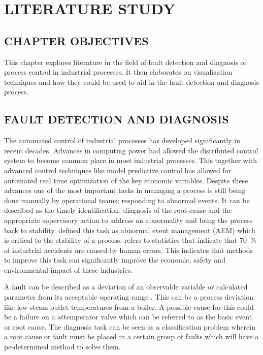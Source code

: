 
\chapter{LITERATURE STUDY}

\section{CHAPTER OBJECTIVES}

This chapter explores literature in the field of fault detection and diagnosis of process control in industrial processes. It then elaborates on visualization techniques and how they could be used to aid in the fault detection and diagnosis process.

\section{FAULT DETECTION AND DIAGNOSIS}

The automated control of industrial processes has developed significantly in recent decades. Advances in computing power had allowed the distributed control system to become common place in most industrial processes. This together with advanced control techniques like model predictive control has allowed for automated real time optimization of the key economic variables. Despite these advances one of the most important tasks in managing a process is still being done manually by operational teams; responding to abnormal events. It can be described as the timely identification, diagnosis of the root cause and the appropriate supervisory action to address an abnormality and bring the process back to stability. \cite{venkatasubramanian2003review} defined this task as abnormal event management (AEM) which is critical to the stability of a process. \cite{venkatasubramanian2003review} refers to statistics that indicate that \SI{70}{\percent} of industrial accidents are caused by human errors. This indicates that methods to improve this task can significantly improve the economic, safety and environmental impact of these industries.

A fault can be described as a deviation of an observable variable or calculated parameter from its acceptable operating range \cite{venkatasubramanian2003review}. This can be a process deviation like low steam outlet temperatures from a boiler. A possible cause for this could be a failure on a attemperator valve which can be referred to as the basic event or root cause. The diagnosis task can be seen as a classification problem wherein a root cause or fault must be placed in a certain group of faults which will have a pe-determined method to solve them.


